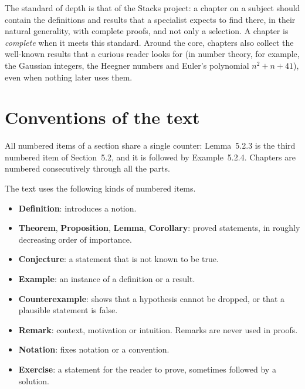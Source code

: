 \begin{remark}\label{introduction:remark-depth}
The standard of depth is that of the Stacks project: a chapter on a subject
should contain the definitions and results that a specialist expects to find
there, in their natural generality, with complete proofs, and not only a
selection. A chapter is \emph{complete} when it meets this standard. Around
the core, chapters also collect the well-known results that a curious reader
looks for (in number theory, for example, the Gaussian integers, the Heegner
numbers and Euler's polynomial $n^2 + n + 41$), even when nothing later uses
them.
\end{remark}

\section{Conventions of the text}\label{introduction:section-conventions}

\begin{notation}\label{introduction:notation-numbering}
All numbered items of a section share a single counter: Lemma~5.2.3 is the
third numbered item of Section~5.2, and it is followed by Example~5.2.4.
Chapters are numbered consecutively through all the parts.
\end{notation}

\begin{notation}\label{introduction:notation-environments}
The text uses the following kinds of numbered items.
\begin{itemize}
\item \textbf{Definition}: introduces a notion.
\item \textbf{Theorem}, \textbf{Proposition}, \textbf{Lemma},
\textbf{Corollary}: proved statements, in roughly decreasing order of
importance.
\item \textbf{Conjecture}: a statement that is not known to be true.
\item \textbf{Example}: an instance of a definition or a result.
\item \textbf{Counterexample}: shows that a hypothesis cannot be dropped, or
that a plausible statement is false.
\item \textbf{Remark}: context, motivation or intuition. Remarks are never used
in proofs.
\item \textbf{Notation}: fixes notation or a convention.
\item \textbf{Exercise}: a statement for the reader to prove, sometimes followed
by a solution.
\end{itemize}
\end{notation}

